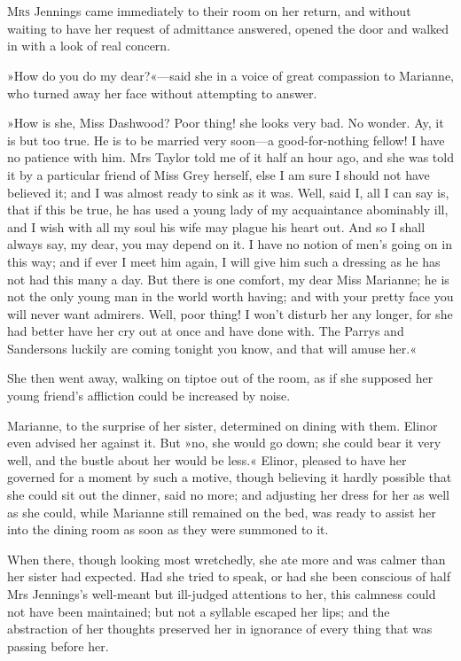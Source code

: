 \chapter[Chapter \thechapter]{}
\lettrine[lines=4,lraise=0.3]{M}{rs} Jennings came immediately to their room on her return, and without waiting to have her request of admittance answered, opened the door and walked in with a look of real concern.

\zz
»How do you do my dear?«—said she in a voice of great compassion to Marianne, who turned away her face without attempting to answer.

»How is she, Miss Dashwood? Poor thing! she looks very bad. No wonder. Ay, it is but too true. He is to be married very soon—a good-for-nothing fellow! I have no patience with him. Mrs Taylor told me of it half an hour ago, and she was told it by a particular friend of Miss Grey herself, else I am sure I should not have believed it; and I was almost ready to sink as it was. Well, said I, all I can say is, that if this be true, he has used a young lady of my acquaintance abominably ill, and I wish with all my soul his wife may plague his heart out. And so I shall always say, my dear, you may depend on it. I have no notion of men’s going on in this way; and if ever I meet him again, I will give him such a dressing as he has not had this many a day. But there is one comfort, my dear Miss Marianne; he is not the only young man in the world worth having; and with your pretty face you will never want admirers. Well, poor thing! I won’t disturb her any longer, for she had better have her cry out at once and have done with. The Parrys and Sandersons luckily are coming tonight you know, and that will amuse her.«

She then went away, walking on tiptoe out of the room, as if she supposed her young friend’s affliction could be increased by noise.

Marianne, to the surprise of her sister, determined on dining with them. Elinor even advised her against it. But »no, she would go down; she could bear it very well, and the bustle about her would be less.« Elinor, pleased to have her governed for a moment by such a motive, though believing it hardly possible that she could sit out the dinner, said no more; and adjusting her dress for her as well as she could, while Marianne still remained on the bed, was ready to assist her into the dining room as soon as they were summoned to it.

When there, though looking most wretchedly, she ate more and was calmer than her sister had expected. Had she tried to speak, or had she been conscious of half Mrs Jennings’s well-meant but ill-judged attentions to her, this calmness could not have been maintained; but not a syllable escaped her lips; and the abstraction of her thoughts preserved her in ignorance of every thing that was passing before her.

